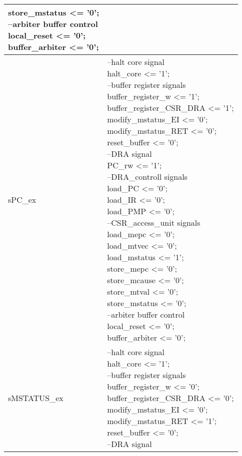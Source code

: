 \begin{small}
\begin{longtable}{| p{} | p{} |}
{		store\_mstatus <= '0';\\
		--arbiter buffer control\\
		local\_reset <= '0';\\
		buffer\_arbiter <= '0';} \\
	\hline
	sPC\_ex & \makecell{--halt core signal\\
		halt\_core <= '1';\\
		--buffer register signals\\
		buffer\_register\_w <= '1';\\
		buffer\_register\_CSR\_DRA <= '1';\\
		modify\_mstatus\_EI <= '0';\\
		modify\_mstatus\_RET <= '0';\\
		reset\_buffer <= '0';\\
		--DRA signal\\
		PC\_rw <= '1';\\
		--DRA\_controll signals\\
		load\_PC <= '0';\\
		load\_IR <= '0';\\
		load\_PMP <= '0';\\
		--CSR\_access\_unit signals\\
		load\_mepc <= '0';\\
		load\_mtvec <= '0';\\
		load\_mstatus <= '1';\\
		store\_mepc <= '0';\\
		store\_mcause <= '0';\\
		store\_mtval <= '0';\\
		store\_mstatus <= '0';\\
		--arbiter buffer control\\
		local\_reset <= '0';\\
		buffer\_arbiter <= '0';} \\
	\hline
	sMSTATUS\_ex & \makecell{--halt core signal\\
		halt\_core <= '1';\\
		--buffer register signals\\
		buffer\_register\_w <= '0';\\
		buffer\_register\_CSR\_DRA <= '0';\\
		modify\_mstatus\_EI <= '0';\\
		modify\_mstatus\_RET <= '1';\\
		reset\_buffer <= '0';\\
		--DRA signal\\
}
\end{longtable}
\end{small}
